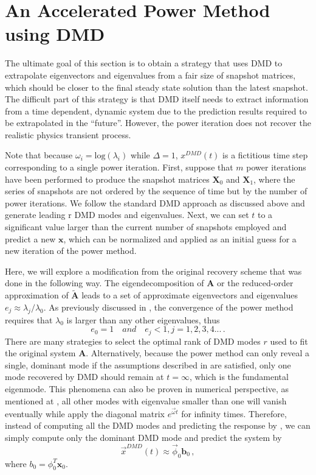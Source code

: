 \section{An Accelerated Power Method using DMD}
\label{sec:dmdpi}
The ultimate goal of this section is to obtain a strategy that uses DMD to extrapolate eigenvectors and eigenvalues from a fair size of snapshot matrices, which should be closer to the final steady state solution than the latest snapshot.
The difficult part of this strategy is that DMD itself needs to extract information from a time dependent, dynamic system due to the prediction results required to be extrapolated in the ``future''.
However, the power iteration does not recover the realistic physics transient process. 

Note that because $\omega_i= \text{log}(\lambda_i)$ while $\Delta = 1$, $x^{DMD}(t)$ is a fictitious time step corresponding to a single power iteration.
First, suppose that $m$ power iterations have been performed to produce the snapshot matrices $\mathbf{X}_0$ and $\mathbf{X}_1$, where the series of snapshots are not ordered by the sequence of time but by the number of power iterations.
We follow the standard DMD approach as discussed above and generate leading r DMD modes and eigenvalues.
Next, we can set $t$ to a significant value larger than the current number of snapshots employed and predict a new $\mathbf{x}$, which can be normalized and applied as an initial guess for a new iteration of the power method.

Here, we will explore a modification from the original recovery scheme that was done in the following way.
The eigendecomposition of $\mathbf{A}$ or the reduced-order approximation of $\mathbf{\tilde{A}}$ leads to a set of approximate eigenvectors and eigenvalues $e_j \approx \lambda_j / \lambda_0$.
As previously discussed in , the convergence of the power method requires that $\lambda_0$ is larger than any other eigenvalues, thus 
\begin{equation}
\label{eq:ej}
e_0 = 1 \quad and  \quad e_j < 1,j = 1,2,3,4... \, .
\end{equation}
There are many strategies to select the optimal rank of DMD modes $r$ used to fit the original system $\mathbf{A}$. 
Alternatively, because the power method can only reveal a single, dominant mode if the assumptions described in  are satisfied, only one mode recovered by DMD should remain at $t=\infty$, which is the fundamental eigenmode.
This phenomena can also be proven in numerical perspective, as mentioned at , all other modes with eigenvalue smaller than one will vanish eventually while apply the diagonal matrix $e^{\vec{\omega}t}$ for infinity times.
Therefore, instead of computing all the DMD modes and predicting the response by , we can simply compute only the dominant DMD mode and predict the system by 
\begin{equation}
\label{eq:f_mode}
\vec{x}^{DMD}(t) \approx \vec{\phi}_0 \mathbf{b}_0 \, ,
\end{equation}
where $b_0= \phi^{T}_0 \mathbf{x}_{0}$.

